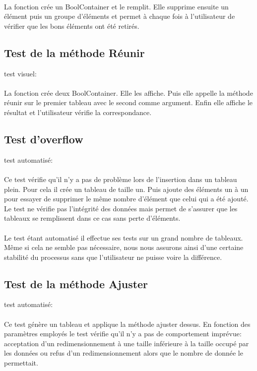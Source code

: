 \documentclass[a4paper, 12pts]{article}
\begin{document}
\paragraph{}
La fonction crée un BoolContainer et le remplit. Elle supprime ensuite un élément puis un groupe d’éléments et permet à chaque fois à l’utilisateur de vérifier que les bons éléments ont été retirés.

\subsection{Test de la méthode Réunir}
test visuel:
\paragraph{}
La fonction crée deux BoolContainer. Elle les affiche. Puis elle appelle la méthode réunir sur le premier tableau avec le second comme argument. Enfin elle affiche le résultat et l’utilisateur vérifie la correspondance.

\subsection{Test d'overflow}
test automatisé:
\paragraph{}
Ce test vérifie qu'il n'y a pas de problème lors de l'insertion dans un tableau plein. Pour cela il crée un tableau de taille un. Puis ajoute des éléments un à un pour essayer de supprimer le même nombre d’élément que celui qui a été ajouté. Le test ne vérifie pas l’intégrité des données mais permet de s'assurer que les tableaux se remplissent dans ce cas sans perte d'éléments.
\paragraph{}
Le test étant automatisé il effectue ses tests sur un grand nombre de tableaux. Même si cela ne semble pas nécessaire, nous nous assurons ainsi d'une certaine stabilité du processus sans que l'utilisateur ne puisse voire la différence.

\subsection{Test de la méthode Ajuster}
test automatisé:
\paragraph{}
Ce test génère un tableau et applique la méthode ajuster dessus. En fonction des paramètres employés le test vérifie qu'il n'y a pas de comportement imprévue: acceptation d'un redimensionnement à une taille inférieure à la taille occupé par les données ou refus d'un redimensionnement alors que le nombre de donnée le permettait.
\end{document}
